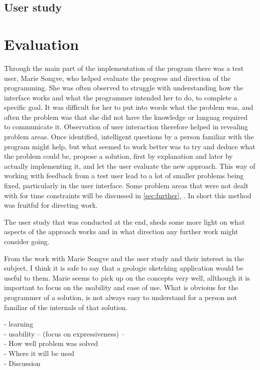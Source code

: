 \documentclass[a4paper,12pt]{report}
\newcommand{\secref}[1]{\autoref{#1}, \nameref{#1}}
\begin{document}
\section{User study}

\clearpage
\chapter{Evaluation}
\label{sec:eval}
Through the main part of the implementation of the program there was a test user, Marie Songve, who helped evaluate the progress and direction of the programming. She was often observed to struggle with understanding how the interface works and what the programmer intended her to do, to complete a specific goal. It was difficult for her to put into words what the problem was, and often the problem was that she did not have the knowledge or languag required to communicate it. Observation of user interaction therefore helped in revealing problem areas. Once identified, intelligent questions by a person familiar with the program might help, but what seemed to work better was to try and deduce what the problem could be, propose a solution, first by explanation and later by actually implementing it, and let the user evaluate the new approach. This way of working with feedback from a test user lead to a lot of smaller problems being fixed, particularly in the user interface. Some problem areas that were not dealt with for time constraints will be discussed in \secref{sec:further}. In short this method was fruitful for directing work.

The user study that was conducted at the end, sheds some more light on what aspects of the approach works and in what direction any further work might consider going. 

From the work with Marie Songve and the user study and their interest in the subject, I think it is safe to say that a geologic sketching application would be useful to them. Marie seems to pick up on the concepts very well, allthough it is important to focus on the usability and ease of use. What is obvioius for the programmer of a solution, is not always easy to understand for a person not familiar of the internals of that solution. 

- learning\\
- usability
 -- (focus on expressiveness) -- \\
- How well problem was solved\\
- Where it will be used \\
- Discussion
\end{document}
